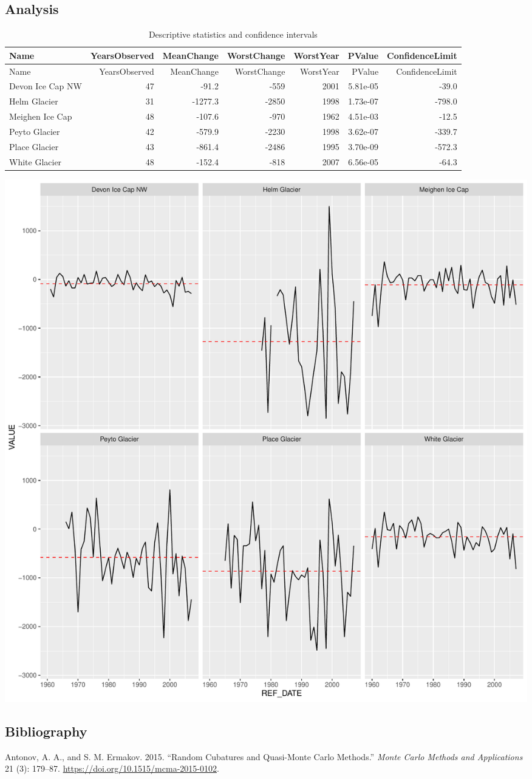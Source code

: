 \documentclass[]{article}
\begin{document}
\hypertarget{analysis}{%
\subsection{Analysis}\label{analysis}}

\begin{longtable}[]{@{}lrrrrrr@{}}
\caption{Descriptive statistics and confidence intervals}\tabularnewline
\toprule
Name & YearsObserved & MeanChange & WorstChange & WorstYear & PValue &
ConfidenceLimit\tabularnewline
\midrule
\endfirsthead
\toprule
Name & YearsObserved & MeanChange & WorstChange & WorstYear & PValue &
ConfidenceLimit\tabularnewline
\midrule
\endhead
Devon Ice Cap NW & 47 & -91.2 & -559 & 2001 & 5.81e-05 &
-39.0\tabularnewline
Helm Glacier & 31 & -1277.3 & -2850 & 1998 & 1.73e-07 &
-798.0\tabularnewline
Meighen Ice Cap & 48 & -107.6 & -970 & 1962 & 4.51e-03 &
-12.5\tabularnewline
Peyto Glacier & 42 & -579.9 & -2230 & 1998 & 3.62e-07 &
-339.7\tabularnewline
Place Glacier & 43 & -861.4 & -2486 & 1995 & 3.70e-09 &
-572.3\tabularnewline
White Glacier & 48 & -152.4 & -818 & 2007 & 6.56e-05 &
-64.3\tabularnewline
\bottomrule
\end{longtable}

\includegraphics{Test_files/figure-latex/ggplot-1.pdf}

\hypertarget{bibliography}{%
\subsection*{Bibliography}\label{bibliography}}

\hypertarget{refs}{}
\leavevmode\hypertarget{ref-AntonovErmakov_RandomCubaturesQMS}{}%
Antonov, A. A., and S. M. Ermakov. 2015. ``Random Cubatures and
Quasi-Monte Carlo Methods.'' \emph{Monte Carlo Methods and Applications}
21 (3): 179--87. \url{https://doi.org/10.1515/mcma-2015-0102}.
\end{document}

